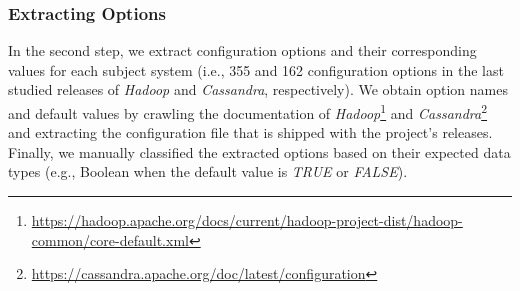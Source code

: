 \subsubsection{Extracting Options}

In the second step, we extract configuration options and their corresponding values for each subject system (i.e., 355 and 162 configuration options in the last studied releases of \emph{Hadoop} and \emph{Cassandra}, respectively). %
We obtain option names and default values by crawling the documentation of \emph{Hadoop}\footnote{\url{https://hadoop.apache.org/docs/current/hadoop-project-dist/hadoop-common/core-default.xml}} and \emph{Cassandra}\footnote{\url{https://cassandra.apache.org/doc/latest/configuration}} and extracting the configuration file that is shipped with the project's releases. Finally, we manually classified the extracted options based on their expected data types (e.g., Boolean when the default value is \emph{TRUE} or \emph{FALSE}).


